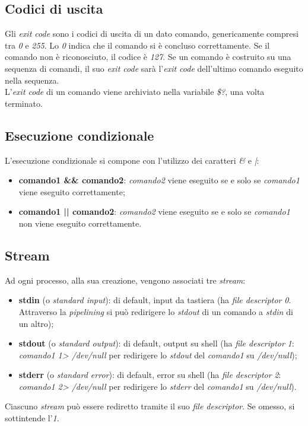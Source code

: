 \subsection{Codici di uscita}
Gli \textit{exit code} sono i codici di uscita di un dato comando, genericamente compresi tra \textit{0} e \textit{255}. Lo \textit{0} indica che il comando si è concluso correttamente. Se il comando non è riconosciuto, il codice è \textit{127}. Se un comando è costruito su una sequenza di comandi, il suo \textit{exit code} sarà l'\textit{exit code} dell'ultimo comando eseguito nella sequenza. \\
L'\textit{exit code} di un comando viene archiviato nella variabile \textit{\$?}, una volta terminato.

\subsection{Esecuzione condizionale}
L'esecuzione condizionale si compone con l'utilizzo dei caratteri \textit{\&} e \textit{|}:
\begin{itemize}
	\item \textbf{comando1 \&\& comando2}: \textit{comando2} viene eseguito se e solo se \textit{comando1} viene eseguito correttamente;
	\item \textbf{comando1 || comando2}: \textit{comando2} viene eseguito se e solo se \textit{comando1} non viene eseguito correttamente.
\end{itemize}

\subsection{Stream}
Ad ogni processo, alla sua creazione, vengono associati tre \textit{stream}:
\begin{itemize}
	\item \textbf{stdin} (o \textit{standard input}): di default, input da tastiera (ha \textit{file descriptor} \textit{0}. Attraverso la \textit{pipelining} si può redirigere lo \textit{stdout} di un comando a \textit{stdin} di un altro);
	\item \textbf{stdout} (o \textit{standard output}): di default, output su shell (ha \textit{file descriptor} \textit{1}: \textit{comando1 1> /dev/null} per redirigere lo \textit{stdout} del \textit{comando1} su \textit{/dev/null});
	\item \textbf{stderr} (o \textit{standard error}): di default, error su shell (ha \textit{file descriptor} \textit{2}: \textit{comando1 2> /dev/null} per redirigere lo \textit{stderr} del \textit{comando1} su \textit{/dev/null}).
\end{itemize}
Ciascuno \textit{stream} può essere rediretto tramite il suo \textit{file descriptor}. Se omesso, si sottintende l'\textit{1}.